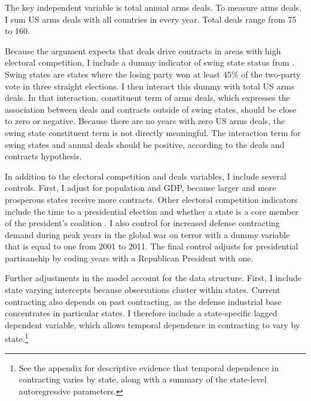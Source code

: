 \documentclass[12pt]{article}
\begin{document}
The key independent variable is total annual arms deals.  
To measure arms deals, I sum US arms deals with all countries in every year. 
Total deals range from 75 to 160. 


Because the argument expects that deals drive contracts in areas with high electoral competition, I include a dummy indicator of swing state status from \citet{KrinerReeves2015}.
Swing states are states where the losing party won at least 45\% of the two-party vote in three straight elections. 
I then interact this dummy with total US arms deals. 
In that interaction, constituent term of arms deals, which expresses the association between deals and contracts outside of swing states, should be close to zero or negative.
Because there are no years with zero US arms deals, the swing state constituent term is not directly meaningful.  
The interaction term for swing states and annual deals should be positive, according to the deals and contracts hypothesis.


In addition to the electoral competition and deals variables, I include several controls. 
First, I adjust for population and GDP, because larger and more prosperous states receive more contracts. 
Other electoral competition indicators include the time to a presidential election and whether a state is a core member of the president's coalition \citep{KrinerReeves2015}. 
I also control for increased defense contracting demand during peak years in the global war on terror with a dummy variable that is equal to one from 2001 to 2011. 
The final control adjusts for presidential partisanship by coding years with a Republican President with one. 


Further adjustments in the model account for the data structure.
First, I include state varying intercepts because observations cluster within states. 
Current contracting also depends on past contracting, as the defense industrial base concentrates in particular states. 
I therefore include a state-specific lagged dependent variable, which allows temporal dependence in contracting to vary by state.\footnote{See the appendix for descriptive evidence that temporal dependence in contracting varies by state, along with a summary of the state-level autoregressive parameters.}


\end{document}
